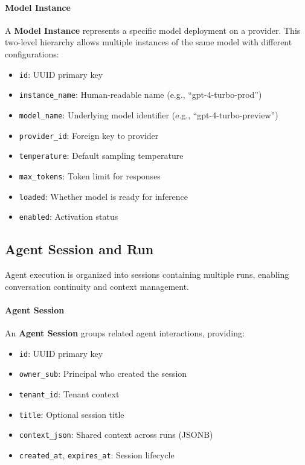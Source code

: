\paragraph{Model Instance}
A \textbf{Model Instance} represents a specific model deployment on a provider. This two-level hierarchy allows multiple instances of the same model with different configurations:
\begin{itemize}
    \item \texttt{id}: UUID primary key
    \item \texttt{instance\_name}: Human-readable name (e.g., ``gpt-4-turbo-prod'')
    \item \texttt{model\_name}: Underlying model identifier (e.g., ``gpt-4-turbo-preview'')
    \item \texttt{provider\_id}: Foreign key to provider
    \item \texttt{temperature}: Default sampling temperature
    \item \texttt{max\_tokens}: Token limit for responses
    \item \texttt{loaded}: Whether model is ready for inference
    \item \texttt{enabled}: Activation status
\end{itemize}

\subsection{Agent Session and Run}

Agent execution is organized into sessions containing multiple runs, enabling conversation continuity and context management.

\paragraph{Agent Session}
An \textbf{Agent Session} groups related agent interactions, providing:
\begin{itemize}
    \item \texttt{id}: UUID primary key
    \item \texttt{owner\_sub}: Principal who created the session
    \item \texttt{tenant\_id}: Tenant context
    \item \texttt{title}: Optional session title
    \item \texttt{context\_json}: Shared context across runs (JSONB)
    \item \texttt{created\_at}, \texttt{expires\_at}: Session lifecycle
\end{itemize}

